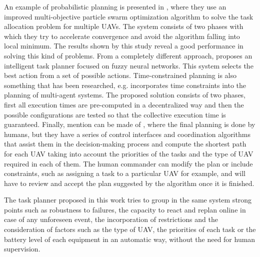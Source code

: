 An example of probabilistic planning is presented in \cite{gao2018multi}, where they use an improved multi-objective particle swarm optimization algorithm to solve the task allocation problem for multiple \glspl{UAV}. The system consists of two phases with which they try to accelerate convergence and avoid the algorithm falling into local minimum. The results shown by this study reveal a good performance in solving this kind of problems. From a completely different approach, \cite{jolly2010intelligent} proposes an intelligent task planner focused on fuzzy neural networks. This system selects the best action from a set of possible actions. Time-constrained planning is also something that has been researched, e.g. \cite{nikou2016cooperative} incorporates time constraints into the planning of multi-agent systems. The proposed solution consists of two phases, first all execution times are pre-computed in a decentralized way and then the possible configurations are tested so that the collective execution time is guaranteed. Finally, mention can be made of \cite{ramchurn2015study}, where the final planning is done by humans, but they have a series of control interfaces and coordination algorithms that assist them in the decision-making process and compute the shortest path for each \gls{UAV} taking into account the priorities of the tasks and the type of \gls{UAV} required in each of them. The human commander can modify the plan or include constraints, such as assigning a task to a particular \gls{UAV} for example, and will have to review and accept the plan suggested by the algorithm once it is finished.

The task planner proposed in this work tries to group in the same system strong points such as robustness to failures, the capacity to react and replan online in case of any unforeseen event, the incorporation of restrictions and the consideration of factors such as the type of \gls{UAV}, the priorities of each task or the battery level of each equipment in an automatic way, without the need for human supervision.

